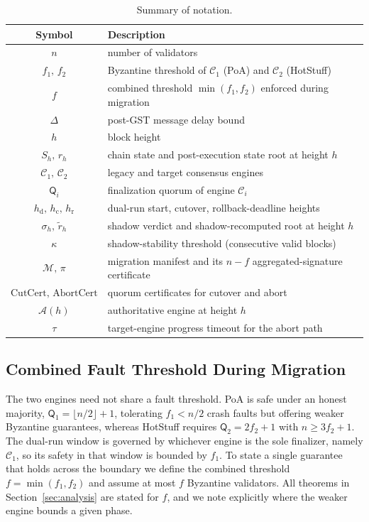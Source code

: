 \documentclass[journal]{IEEEtran}
\theoremstyle{remark}
\begin{document}
\begin{table}[t]
\centering
\caption{Summary of notation.}
\label{tab:notation}
\renewcommand{\arraystretch}{1.15}
\footnotesize
\begin{tabular}{c p{}}
\toprule
Symbol & Description \\
\midrule
$n$ & number of validators \\
$f_1,\,f_2$ & Byzantine threshold of $\mathcal{C}_1$ (PoA) and $\mathcal{C}_2$ (HotStuff) \\
$f$ & combined threshold $\min(f_1,f_2)$ enforced during migration \\
$\Delta$ & post-GST message delay bound \\
$h$ & block height \\
$S_h,\,r_h$ & chain state and post-execution state root at height $h$ \\
$\mathcal{C}_1,\,\mathcal{C}_2$ & legacy and target consensus engines \\
$\mathsf{Q}_i$ & finalization quorum of engine $\mathcal{C}_i$ \\
$h_{\mathrm{d}},\,h_{\mathrm{c}},\,h_{\mathrm{r}}$ & dual-run start, cutover, rollback-deadline heights \\
$\sigma_h,\,\tilde r_h$ & shadow verdict and shadow-recomputed root at height $h$ \\
$\kappa$ & shadow-stability threshold (consecutive valid blocks) \\
$\mathcal{M},\,\pi$ & migration manifest and its $n{-}f$ aggregated-signature certificate \\
$\mathrm{CutCert},\,\mathrm{AbortCert}$ & quorum certificates for cutover and abort \\
$\mathcal{A}(h)$ & authoritative engine at height $h$ \\
$\tau$ & target-engine progress timeout for the abort path \\
\bottomrule
\end{tabular}
\end{table}

\subsection{Combined Fault Threshold During Migration}
The two engines need not share a fault threshold. PoA is safe under an honest majority,
$\mathsf{Q}_1=\lfloor n/2\rfloor+1$, tolerating $f_1 < n/2$ crash faults but offering weaker
Byzantine guarantees, whereas HotStuff requires $\mathsf{Q}_2=2f_2+1$ with $n\ge 3f_2+1$. The
dual-run window is governed by whichever engine is the sole finalizer, namely $\mathcal{C}_1$,
so its safety in that window is bounded by $f_1$. To state a single guarantee that holds
across the boundary we define the combined threshold $f=\min(f_1,f_2)$ and assume at most $f$
Byzantine validators. All theorems in Section~\ref{sec:analysis} are stated for $f$, and we
note explicitly where the weaker engine bounds a given phase.
\end{document}
